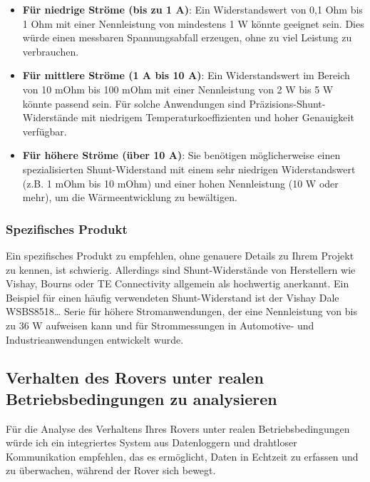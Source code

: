 \documentclass{vorlage-design-main}
\begin{document}
\begin{itemize}
\item
  \textbf{Für niedrige Ströme (bis zu 1 A)}: Ein Widerstandswert von 0,1
  Ohm bis 1 Ohm mit einer Nennleistung von mindestens 1 W könnte
  geeignet sein. Dies würde einen messbaren Spannungsabfall erzeugen,
  ohne zu viel Leistung zu verbrauchen.
\item
  \textbf{Für mittlere Ströme (1 A bis 10 A)}: Ein Widerstandswert im
  Bereich von 10 mOhm bis 100 mOhm mit einer Nennleistung von 2 W bis 5
  W könnte passend sein. Für solche Anwendungen sind
  Präzisions-Shunt-Widerstände mit niedrigem Temperaturkoeffizienten und
  hoher Genauigkeit verfügbar.
\item
  \textbf{Für höhere Ströme (über 10 A)}: Sie benötigen möglicherweise
  einen spezialisierten Shunt-Widerstand mit einem sehr niedrigen
  Widerstandswert (z.B. 1 mOhm bis 10 mOhm) und einer hohen Nennleistung
  (10 W oder mehr), um die Wärmeentwicklung zu bewältigen.
\end{itemize}

\hypertarget{spezifisches-produkt}{%
\subsubsection{Spezifisches Produkt}\label{spezifisches-produkt}}

Ein spezifisches Produkt zu empfehlen, ohne genauere Details zu Ihrem
Projekt zu kennen, ist schwierig. Allerdings sind Shunt-Widerstände von
Herstellern wie Vishay, Bourns oder TE Connectivity allgemein als
hochwertig anerkannt. Ein Beispiel für einen häufig verwendeten
Shunt-Widerstand ist der Vishay Dale WSBS8518\ldots{} Serie für höhere
Stromanwendungen, der eine Nennleistung von bis zu 36 W aufweisen kann
und für Strommessungen in Automotive- und Industrieanwendungen
entwickelt wurde.

\hypertarget{verhalten-des-rovers-unter-realen-betriebsbedingungen-zu-analysieren}{%
\subsection{Verhalten des Rovers unter realen Betriebsbedingungen zu
analysieren}\label{verhalten-des-rovers-unter-realen-betriebsbedingungen-zu-analysieren}}

Für die Analyse des Verhaltens Ihres Rovers unter realen
Betriebsbedingungen würde ich ein integriertes System aus Datenloggern
und drahtloser Kommunikation empfehlen, das es ermöglicht, Daten in
Echtzeit zu erfassen und zu überwachen, während der Rover sich bewegt.
\end{document}

